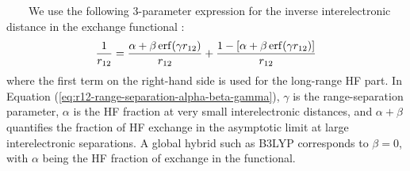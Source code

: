 \documentclass[landscape,a0b,final]{a0poster}
\newcommand{\bindent}{\ \ \ \ }
\newenvironment{poster}{
  \begin{center}
  \begin{minipage}[c]{0.98\textwidth}
}{
  \end{minipage} 
  \end{center}
}
\begin{document}
\begin{poster}
\begin{multicols}{3}
    \bindent We use the following 3-parameter expression for the inverse
    interelectronic distance in the exchange functional
    \cite{yanai_new_2004}:
        \vspace{-1.8cm}
    \begin{equation}
        \vspace{-1.8cm}
    \label{eq:r12-range-separation-alpha-beta-gamma}
    \frac{1}{r_{12}} =
    \frac{\alpha + \beta \operatorname{erf} (\gamma r_{12})}{r_{12}} + 
    \frac{1-[\alpha + \beta \operatorname{erf} (\gamma r_{12})]}{r_{12}} 
    \end{equation}
    where the first term on the right-hand side is used for the long-range
    HF part. In Equation (\ref{eq:r12-range-separation-alpha-beta-gamma}),
    $\gamma$ is the range-separation parameter, $\alpha$ is the HF
    fraction at very small interelectronic distances, and $\alpha+\beta$
    quantifies the fraction of HF exchange in the asymptotic limit at
    large interelectronic separations. A global hybrid such as B3LYP
    corresponds to $\beta = 0$, with $\alpha$ being the HF fraction of
    exchange in the functional.


\end{multicols}
\end{poster}
\end{document}
